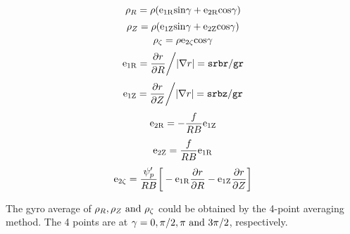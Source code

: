 \documentclass[12pt]{article}
\begin{document}
\begin{CJK*}{UTF8}{gbsn}
\begin{equation*}
    \rho_R = \rho({\rm e_{1R}sin}\gamma + {\rm e_{2R}cos}\gamma)
\end{equation*}
\begin{equation*}
    \rho_Z = \rho({\rm e_{1Z}sin}\gamma + {\rm e_{2Z}cos}\gamma)
\end{equation*}
\begin{equation*}
    \rho_\zeta = \rho{\rm e_{2\zeta}cos}\gamma
\end{equation*}
\begin{equation*}
    {\rm e_{1R}} = \frac{\partial r}{\partial R}\bigg/|\nabla r| = {\tt srbr/gr}
\end{equation*}
\begin{equation*}
    {\rm e_{1Z}} = \frac{\partial r}{\partial Z}\bigg/|\nabla r| = {\tt srbz/gr}
\end{equation*}
\begin{equation*}
    {\rm e_{2R}} = -\frac{f}{RB}{\rm e_{1Z}} 
\end{equation*}
\begin{equation*}
    {\rm e_{2Z}} = \frac{f}{RB}{\rm e_{1R}} 
\end{equation*}
\begin{equation*}
    {\rm e_{2\zeta}} = \frac{\psi_p'}{RB}\bigg[-{\rm e_{1R}}\frac{\partial r}{\partial R} - {\rm e_{1Z}}\frac{\partial r}{\partial Z}\bigg] 
\end{equation*}

The gyro average of $\rho_R, \rho_Z {\rm \ and\ } \rho_\zeta$ could be obtained by the 4-point averaging method.
The 4 points are at $\gamma=0,\pi/2,\pi {\rm \ and\ }3\pi/2$, respectively.


\end{CJK*}
\end{document}

